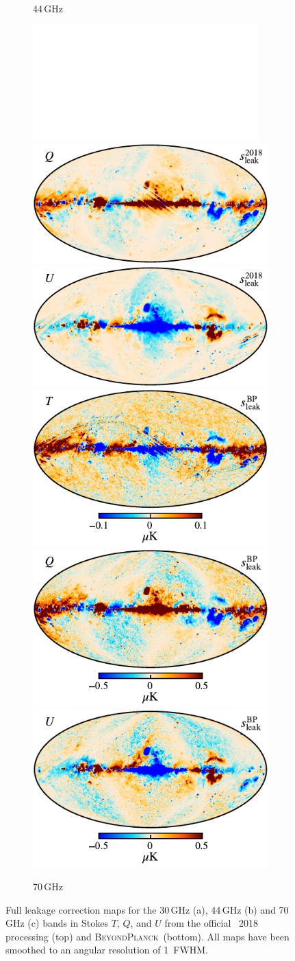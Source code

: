 \documentclass[twocolumn]{aa}
\newcommand{\BP}{\textsc{BeyondPlanck}}
\newcommand{\?}[1]{\textcolor{red}{{\bf [#1]}}}
\begin{document}
\begin{figure}[p]
\begin{subfigure}[t]{\linewidth}
      \caption{44\,GHz}
      \vspace*{3mm}
    \end{subfigure}
    \begin{subfigure}[t]{\linewidth}
      \includegraphics[width=0.32\linewidth]{figs/whitemap.pdf}
      \includegraphics[width=0.32\linewidth]{figs/tod_070_bpcorr_DPC_Q_STOKES_w8_n1024_60arcmin_c-planck.pdf}
      \includegraphics[width=0.32\linewidth]{figs/tod_070_bpcorr_DPC_U_STOKES_w8_n1024_60arcmin_c-planck.pdf}\\
      \includegraphics[width=0.32\linewidth]{figs/tod_070_bpcorr_c0001_k000251_I_Stokes_w8_n1024_60arcmin_cb_c-planck.pdf}
      \includegraphics[width=0.32\linewidth]{figs/tod_070_bpcorr_c0001_k000251_Q_Stokes_w8_n1024_60arcmin_cb_c-planck.pdf}
      \includegraphics[width=0.32\linewidth]{figs/tod_070_bpcorr_c0001_k000251_U_Stokes_w8_n1024_60arcmin_cb_c-planck.pdf}
      \caption{70\,GHz}
    \end{subfigure}
    \caption{Full leakage correction maps for the 30\,GHz (a), 44\,GHz (b) and 70\,GHz (c) bands in Stokes $T$, $Q$, and $U$ from the official \Planck\ 2018 processing (top) and \BP\ (bottom). All maps have been smoothed to an angular resolution of 1\deg\ FWHM.}\label{fig:leakmaps}
  \end{figure}
  
\end{document}
